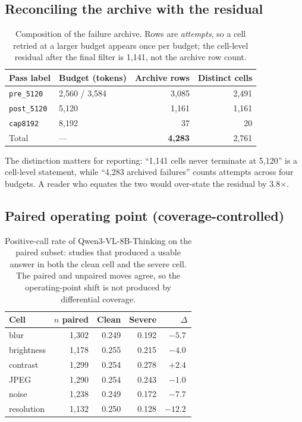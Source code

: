 \subsection*{Reconciling the archive with the residual}

\begin{table}[H]
\centering
\small
\caption{Composition of the failure archive. Rows are \emph{attempts}, so a cell retried at a larger budget appears once per budget; the cell-level residual after the final filter is 1,141, not the archive row count.}
\label{tab:r2recon}
\begin{tabular}{llrr}
\toprule
Pass label & Budget (tokens) & Archive rows & Distinct cells \\
\midrule
\texttt{pre\_5120} & 2,560 / 3,584 & 3,085 & 2,491 \\
\texttt{post\_5120} & 5,120 & 1,161 & 1,161 \\
\texttt{cap8192} & 8,192 & 37 & 20 \\
\midrule
Total & --- & \textbf{4,283} & 2,761 \\
\bottomrule
\end{tabular}
\end{table}

The distinction matters for reporting: ``1,141 cells never terminate at 5,120'' is a cell-level statement, while ``4,283 archived failures'' counts attempts across four budgets. A reader who equates the two would over-state the residual by 3.8$\times$.

\subsection*{Paired operating point (coverage-controlled)}

\begin{table}[H]
\centering
\small
\caption{Positive-call rate of Qwen3-VL-8B-Thinking on the paired subset: studies that produced a usable answer in both the clean cell and the severe cell. The paired and unpaired moves agree, so the operating-point shift is not produced by differential coverage.}
\label{tab:r2posrate}
\begin{tabular}{lrrrr}
\toprule
Cell & $n$ paired & Clean & Severe & $\Delta$ \\
\midrule
blur & 1,302 & 0.249 & 0.192 & $-5.7$\,\pp{} \\
brightness & 1,178 & 0.255 & 0.215 & $-4.0$\,\pp{} \\
contrast & 1,299 & 0.254 & 0.278 & $+2.4$\,\pp{} \\
JPEG & 1,290 & 0.254 & 0.243 & $-1.0$\,\pp{} \\
noise & 1,238 & 0.249 & 0.172 & $-7.7$\,\pp{} \\
resolution & 1,132 & 0.250 & 0.128 & $\mathbf{-12.2}$\,\pp{} \\
\bottomrule
\end{tabular}
\end{table}

